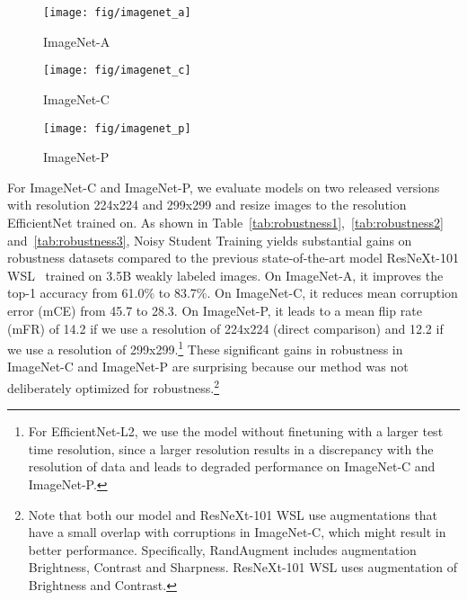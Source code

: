 \documentclass[10pt,twocolumn,letterpaper]{article}
\begin{document}
\begin{figure*}[!htb]
\begin{subfigure}{.33\textwidth}
\centering
  \texttt{[image: fig/imagenet\_a]}
    \caption{ImageNet-A}
        \label{fig:imagenet_a}
\end{subfigure}\hfill
\begin{subfigure}{.33\textwidth}
  \texttt{[image: fig/imagenet\_c]}
\caption{ImageNet-C}
    \label{fig:imagenet_c}
\end{subfigure}\hfill
\begin{subfigure}{.33\textwidth}
  \texttt{[image: fig/imagenet\_p]}
\caption{ImageNet-P}
\label{fig:imagenet_p}
\end{subfigure}\hfill
  \caption{Selected images from robustness benchmarks ImageNet-A, C and P. Test images from ImageNet-C underwent artificial transformations (also known as common corruptions) that cannot be found on the ImageNet training set. Test images on ImageNet-P underwent different scales of perturbations. On ImageNet-A, C, EfficientNet with Noisy Student Tranining produces correct top-1 predictions (shown in \textbf{bold black} texts) and EfficientNet without Noisy Student Training produces incorrect top-1 predictions (shown in \textcolor{red}{red} texts). On ImageNet-P, EfficientNet without Noisy Student Training flips predictions frequently.}
\label{fig:robustnessacp}
\end{figure*}


For ImageNet-C and ImageNet-P, we evaluate models on two released versions with resolution 224x224 and 299x299 and resize images to the resolution EfficientNet trained on. 
As shown in Table~\ref{tab:robustness1},~\ref{tab:robustness2} and~\ref{tab:robustness3}, Noisy Student Training yields substantial gains on robustness datasets compared to the previous state-of-the-art model ResNeXt-101 WSL~\cite{mahajan2018exploring,orhan2019robustness} trained on 3.5B weakly labeled images. On ImageNet-A, it improves the top-1 accuracy from 61.0\% to 83.7\%. On ImageNet-C, it reduces mean corruption error (mCE) from 45.7 to 28.3. On ImageNet-P, it leads to a mean flip rate (mFR) of 14.2 if we use a resolution of 224x224 (direct comparison) and 12.2 if we use a resolution of 299x299.\footnote{For EfficientNet-L2, we use the model without finetuning with a larger test time resolution, since a larger resolution results in a discrepancy with the resolution of data and leads to degraded performance on ImageNet-C and ImageNet-P.}
These significant gains in robustness in ImageNet-C and ImageNet-P are surprising because our method was not deliberately optimized for robustness.\footnote{Note that both our model and ResNeXt-101 WSL use augmentations that have a small overlap with corruptions in ImageNet-C, which might result in better performance. 
Specifically, RandAugment includes augmentation Brightness, Contrast and Sharpness. ResNeXt-101 WSL uses augmentation of Brightness and Contrast.}
\end{document}
